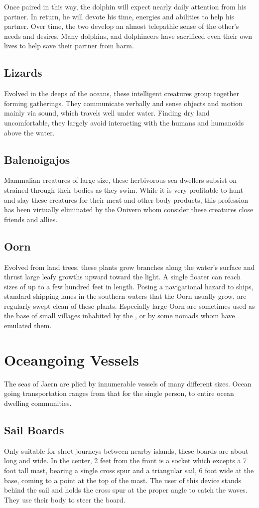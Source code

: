 \begin{multicols*}{2}
Once paired in this way, the dolphin will expect nearly daily attention from his partner. In return, he will devote his time, energies and abilities to help his partner. Over time, the two develop an almost telepathic sense of the other’s needs and desires. Many dolphins, and dolphineers have sacrificed even their own lives to help save their partner from harm.
\subsection{Lizards}
Evolved in the deeps of the oceans, these intelligent creatures group together forming gatherings. They communicate verbally and sense objects and motion mainly via sound, which travels well under water. Finding dry land uncomfortable, they largely avoid interacting with the humans and humanoids above the water.
\subsection{Balenoigajos}
Mammalian creatures of large size, these  herbivorous sea dwellers subsist on  strained through their bodies as they swim. While it is very profitable to hunt
and slay these creatures for their meat and other body products, this profession has been virtually eliminated by the Onivero whom consider these creatures close friends and allies.
\subsection{Oorn}
Evolved from land trees, these plants grow branches along the water's surface and thrust large leafy growths upward toward the light. A single floater can reach sizes of up to a few hundred feet in length. Posing a  navigational hazard to ships, standard shipping lanes in the southern waters that the Oorn usually grow, are regularly swept clean of these plants. Especially large Oorn are sometimes used as the base of small villages inhabited by the , or by some nomads whom have emulated them.
\section{Oceangoing Vessels}
The seas of Jaern are plied by innumerable vessels of many different sizes. Ocean going transportation ranges from that for the single person, to entire ocean dwelling communities.
\subsection{Sail Boards}
Only suitable for short journeys between nearby islands, these boards are about  long and  wide. In the center, 2 feet from the front is a socket which excepts a 7 foot tall mast, bearing a single cross spur and a triangular sail, 6 foot wide at the base, coming to a point at the top of the mast. The user of this device stands behind the sail and holds the cross spur at the proper angle to catch the waves. They use their body to steer the board.


\end{multicols*}
